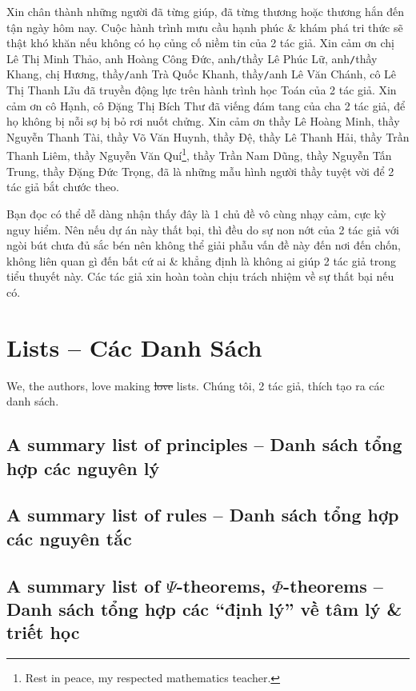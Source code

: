 \documentclass[12pt]{article}
\begin{document}
Xin chân thành những người đã từng giúp, đã từng thương hoặc thương hắn đến tận ngày hôm nay. Cuộc hành trình mưu cầu hạnh phúc \& khám phá tri thức sẽ thật khó khăn nếu không có họ củng cố niềm tin của 2 tác giả. Xin cảm ơn chị {\sc Lê Thị Minh Thảo}, anh {\sc Hoàng Công Đức}, anh{\tt/}thầy {\sc Lê Phúc Lữ}, anh{\tt/}thầy {\sc Khang}, chị {\sc Hương}, thầy{\tt/}anh {\sc Trà Quốc Khanh}, thầy{\tt/}anh {\sc Lê Văn Chánh}, cô {\sc Lê Thị Thanh Lĩu} đã truyền động lực trên hành trình học Toán của 2 tác giả. Xin cảm ơn cô {\sc Hạnh}, cô {\sc Đặng Thị Bích Thư} đã viếng đám tang của cha 2 tác giả, để họ không bị nỗi sợ bị bỏ rơi nuốt chửng. Xin cảm ơn thầy {\sc Lê Hoàng Minh}, thầy {\sc Nguyễn Thanh Tài}, thầy {\sc Võ Văn Huynh}, thầy {\sc Đệ}, thầy {\sc Lê Thanh Hải}, thầy {\sc Trần Thanh Liêm}, thầy {\sc Nguyễn Văn Quí}\footnote{Rest in peace, my respected mathematics teacher.}, thầy {\sc Trần Nam Dũng}, thầy {\sc Nguyễn Tấn Trung}, thầy {\sc Đặng Đức Trọng}, đã là những mẫu hình người thầy tuyệt vời để 2 tác giả bắt chước theo.

Bạn đọc có thể dễ dàng nhận thấy đây là 1 chủ đề vô cùng nhạy cảm, cực kỳ nguy hiểm. Nên nếu dự án này thất bại, thì đều do sự non nớt của 2 tác giả với ngòi bút chưa đủ sắc bén nên không thể giải phẫu vấn đề này đến nơi đến chốn, không liên quan gì đến bất cứ ai \& khẳng định là không ai giúp 2 tác giả trong tiểu thuyết này. Các tác giả xin hoàn toàn chịu trách nhiệm về sự thất bại nếu có.


\appendix

\section{Lists -- Các Danh Sách}
We, the authors, love making \st{love} lists. Chúng tôi, 2 tác giả, thích tạo ra các danh sách.

\subsection{A summary list of principles -- Danh sách tổng hợp các nguyên lý}

\subsection{A summary list of rules -- Danh sách tổng hợp các nguyên tắc}

\subsection{A summary list of $\Psi$-theorems, $\Phi$-theorems -- Danh sách tổng hợp các ``định lý'' về tâm lý \& triết học}
\end{document}
